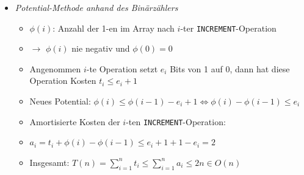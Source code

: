 \documentclass[
    12pt,
    a4paper,
    ngerman,
    color=3b,%
    marginpar=false,
    colorback=false,
    leqno,
]{tudaexercise}
\begin{document}
\begin{itemize}
\begin{itemize}
                \item \textit{Potential-Methode anhand des Binärzählers}
                    \begin{itemize}
                        \item $\phi(i)$: Anzahl der 1-en im Array nach $i$-ter \texttt{INCREMENT}-Operation
                        \item[] $\rightarrow$ $\phi(i)$ nie negativ und $\phi(0) = 0$
                        \item Angenommen $i$-te Operation setzt $e_i$ Bits von 1 auf 0, dann hat diese Operation Kosten $t_i \leq e_i + 1$
                        \item Neues Potential: $\phi(i) \leq \phi(i-1) - e_i + 1 \Leftrightarrow \phi(i) - \phi(i-1) \leq e_i$
                        \item Amortisierte Kosten der $i$-ten \texttt{INCREMENT}-Operation:
                        \item[] $a_i = t_i + \phi(i) - \phi(i-1) \leq e_i + 1 + 1 - e_i = 2$
                        \item Insgesamt: $T(n) = \sum^n_{i=1} t_i \leq \sum^n_{i=1} a_i \leq 2n \in O(n)$ 
                    \end{itemize}
            \end{itemize}
    \end{itemize}

\clearpage
\end{document}
